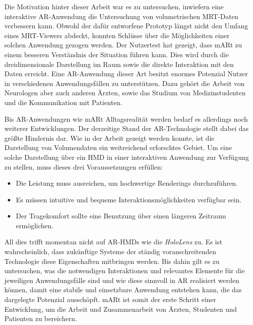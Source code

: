 Die Motivation hinter dieser Arbeit war es zu untersuchen, inwiefern eine interaktive AR-Anwendung die Untersuchung von volumetrischen MRT-Daten verbessern kann. Obwohl der dafür entworfene Prototyp längst nicht den Umfang eines MRT-Viewers abdeckt, konnten Schlüsse über die Möglichkeiten einer solchen Anwendung gezogen werden.
Der Nutzertest hat gezeigt, dass mARt zu einem besseren Verständnis der Situation führen kann. Dies wird durch die dreidimensionale Darstellung im Raum sowie die direkte Interaktion mit den Daten erreicht.
Eine AR-Anwendung dieser Art besitzt enormes Potenzial Nutzer in verschiedenen Anwendungsfällen zu unterstützen. Dazu gehört die Arbeit von Neurologen aber auch anderen Ärzten, sowie das Studium von Medizinstudenten und die Kommunikation mit Patienten. 

Bis AR-Anwendungen wie mARt Alltagsrealität werden bedarf es allerdings noch weiterer Entwicklungen.
Der derzeitige Stand der AR-Technologie stellt dabei das größte Hindernis dar. Wie in der Arbeit gezeigt werden konnte, ist die Darstellung von Volumendaten ein weitreichend erforschtes Gebiet. Um eine solche Darstellung über ein HMD in einer interaktiven Anwendung zur Verfügung zu stellen, muss dieses drei Voraussetzungen erfüllen:

\begin{itemize}
\item Die Leistung muss ausreichen, um hochwertige Renderings durchzuführen.
\item Es müssen intuitive und bequeme Interaktionsmöglichkeiten verfügbar sein.
\item Der Tragekomfort sollte eine Benutzung über einen längeren Zeitraum ermöglichen.
\end{itemize}

All dies trifft momentan nicht auf AR-HMDs wie die \textit{HoloLens} zu. Es ist wahrscheinlich, dass zukünftige Systeme der ständig voranschreitenden Technologie diese Eigenschaften mitbringen werden. 
Bis dahin gilt es zu untersuchen, was die notwendigen Interaktionen und relevantes Elemente für die jeweiligen Anwendungsfälle sind und wie diese sinnvoll in AR realisiert werden können, damit eine stabile und einsetzbare Anwendung entstehen kann, die das dargelegte Potenzial ausschöpft.
mARt ist somit der erste Schritt einer Entwicklung, um die Arbeit und Zusammenarbeit von Ärzten, Studenten und Patienten zu bereichern.
